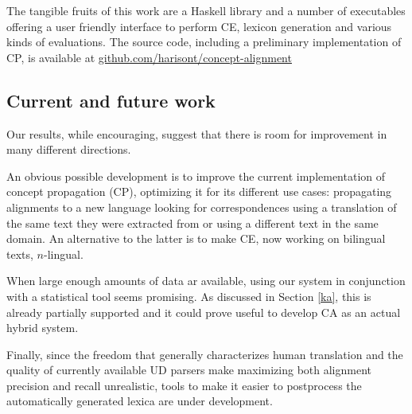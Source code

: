 \documentclass[11pt]{article}
\begin{document}
The tangible fruits of this work are a Haskell library and a number of executables offering a user friendly interface to perform CE, lexicon generation and various kinds of evaluations. 
The source code, including a preliminary implementation of CP, is available at \url{github.com/harisont/concept-alignment}

\subsection{Current and future work}
Our results, while encouraging, suggest that there is room for improvement in many different directions.

An obvious possible development is to improve the current implementation of concept propagation (CP), optimizing it for its different use cases: propagating alignments to a new language looking for correspondences using a translation of the same text they were extracted from or using a different text in the same domain.
An alternative to the latter is to make CE, now working on bilingual texts, $n$-lingual.

When large enough amounts of data ar available, using our system in conjunction with a statistical tool seems promising. 
As discussed in Section \ref{ka}, this is already partially supported and it could prove useful to develop CA as an actual hybrid system. 

Finally, since the freedom that generally characterizes human translation and the quality of currently available UD parsers make maximizing both alignment precision and recall unrealistic, tools to make it easier to postprocess the automatically generated lexica are under development.

  
 
\end{document}
